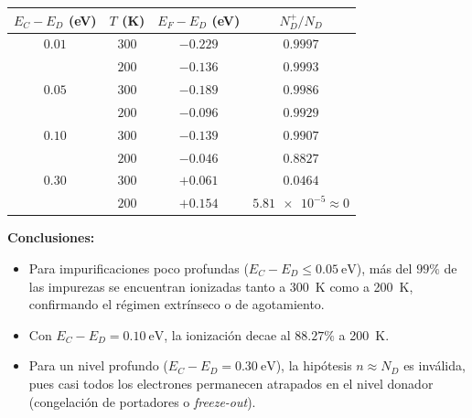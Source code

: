 \begin{problema}
\begin{center}
\begin{tabular}{cccc}
\hline
$E_C - E_D$ (\si{\eV}) & $T$ (\si{\kelvin}) & $E_F - E_D$ (\si{\eV}) & $N_D^+ / N_D$ \\
\hline
$0.01$ & $300$ & $-0.229$ & $0.9997$ \\
       & $200$ & $-0.136$ & $0.9993$ \\
\hline
$0.05$ & $300$ & $-0.189$ & $0.9986$ \\
       & $200$ & $-0.096$ & $0.9929$ \\
\hline
$0.10$ & $300$ & $-0.139$ & $0.9907$ \\
       & $200$ & $-0.046$ & $0.8827$ \\
\hline
$0.30$ & $300$ & $+0.061$ & $0.0464$ \\
       & $200$ & $+0.154$ & $\num{5.81e-5} \approx 0$ \\
\hline
\end{tabular}
\label{tab:ionizacion_donadores}
\end{center}

\textbf{Conclusiones:}
\begin{itemize}
    \item Para impurificaciones poco profundas ($E_C - E_D \le \SI{0.05}{\eV}$), más del $99\%$ de las impurezas se encuentran ionizadas tanto a \SI{300}{\kelvin} como a \SI{200}{\kelvin}, confirmando el régimen extrínseco o de agotamiento.
    \item Con $E_C - E_D = \SI{0.10}{\eV}$, la ionización decae al $88.27\%$ a \SI{200}{\kelvin}.
    \item Para un nivel profundo ($E_C - E_D = \SI{0.30}{\eV}$), la hipótesis $n \approx N_D$ es inválida, pues casi todos los electrones permanecen atrapados en el nivel donador (congelación de portadores o \textit{freeze-out}).
\end{itemize}
\end{problema}

